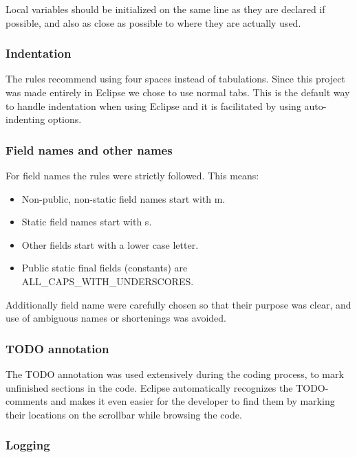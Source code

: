 Local variables should be initialized on the same line as they are declared if possible, and also as close as possible to where they are actually used.

\subsubsection{Indentation}

The rules recommend using four spaces instead of tabulations. Since this project was made entirely in Eclipse we chose to use normal tabs. This is the default way to handle indentation when using Eclipse and it is facilitated by using auto-indenting options.

\subsubsection{Field names and other names}

For field names the rules were strictly followed. This means:

\begin{itemize}

\item Non-public, non-static field names start with m.
\item Static field names start with s.
\item Other fields start with a lower case letter.
\item Public static final fields (constants) are ALL\_CAPS\_WITH\_UNDERSCORES.

\end{itemize}

Additionally field name were carefully chosen so that their purpose was clear, and use of ambiguous names or shortenings was avoided.

\subsubsection{TODO annotation}

The TODO annotation was used extensively during the coding process, to mark unfinished sections in the code. Eclipse automatically recognizes the TODO-comments and makes it even easier for the developer to find them by marking their locations on the scrollbar while browsing the code.

\subsubsection{Logging}


